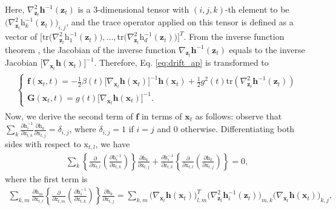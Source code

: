\documentclass{article}
\theoremstyle{definition}
\theoremstyle{remark}
\begin{document}
	Here, $\nabla_{\mathbf{z}_{t}}^{2}\mathbf{h}^{-1}(\mathbf{z}_{t})$ is a 3-dimensional tensor with $(i,j,k)$-th element to be $\big(\nabla_{\mathbf{z}_{t}}^{2}\mathrm{h}_{k}^{-1}(\mathbf{z}_{t})\big)_{i,j}$, and the trace operator applied on this tensor is defined as a vector of $\Big[\text{tr}\big(\nabla_{\mathbf{z}_{t}}^{2}\mathrm{h}_{1}^{-1}(\mathbf{z}_{t})\big),...,\text{tr}\big(\nabla_{\mathbf{z}_{t}}^{2}\mathrm{h}_{d}^{-1}(\mathbf{z}_{t})\big)\Big]^{T}$. From the inverse function theorem \citep{rudin1964principles}, the Jacobian of the inverse function $\nabla_{\mathbf{z}_{t}}\mathbf{h}^{-1}(\mathbf{z}_{t})$ equals to the inverse Jacobian $\big[\nabla_{\mathbf{x}_{t}}\mathbf{h}(\mathbf{x}_{t})\big]^{-1}$. Therefore, Eq. \eqref{eq:drift_ap} is transformed to
	\begin{align}\label{eq:drift_ap_ver2}
	\begin{split}
	\left\{\begin{array}{ll}
	\mathbf{f}(\mathbf{x}_{t},t)=-\frac{1}{2} \beta(t) \big[\nabla_{\mathbf{x}_{t}}\mathbf{h}(\mathbf{x}_{t})\big]^{-1} \mathbf{h}(\mathbf{x}_{t}) + \frac{1}{2} g^{2}(t) \text{tr} \left ( \nabla_{\mathbf{z}_{t}}^{2} \mathbf{h}^{-1}(\mathbf{z}_{t})    \right )\\[0.1cm]
	\mathbf{G}(\mathbf{x}_{t},t)=g(t) \big[\nabla_{\mathbf{x}_{t}}\mathbf{h}(\mathbf{x}_{t})\big]^{-1}.
	\end{array}\right.
	\end{split}
	\end{align}	
	Now, we derive the second term of $\mathbf{f}$ in terms of $\mathbf{x}_{t}$ as follows: observe that $\sum_{k}\frac{\partial \mathrm{h}_{i}^{-1}}{\partial\mathrm{z}_{t,k}}\frac{\partial\mathrm{h}_{k}}{\partial\mathrm{x}_{t,j}}=\delta_{i,j}$, where $\delta_{i,j}=1$ if $i=j$ and $0$ otherwise. Differentiating both sides with respect to $\mathrm{x}_{t,l}$, we have
	\begin{align*}
	\sum_{k} \left \{  \frac{\partial}{\partial \mathrm{x}_{t,l}} \left ( \frac{\partial \mathrm{h}^{-1}_{i}}{\partial \mathrm{z}_{t,k}} \right ) \right \} \frac{\partial \mathrm{h}_{k}}{\partial \mathrm{x}_{t,j}} + \frac{\partial \mathrm{h}^{-1}_{i}}{\partial \mathrm{z}_{t,k}} \left \{  \frac{\partial}{\partial \mathrm{x}_{t,l}} \left (\frac{\partial \mathrm{h}_{k}}{\partial \mathrm{x}_{t,j}} \right ) \right \}=0,
	\end{align*}
	where the first term is
	\begin{align*}
	\sum_{k,m} \frac{\partial \mathrm{h}_{m}}{\partial \mathrm{x}_{t,l}} \left \{  \frac{\partial}{\partial \mathrm{z}_{t,m}} \left ( \frac{\partial \mathrm{h}^{-1}_{i}}{\partial \mathrm{z}_{t,k}} \right ) \right \} \frac{\partial \mathrm{h}_{k}}{\partial \mathrm{x}_{t,j}} = \sum_{k,m} \big( \nabla_{\mathbf{x}_{t}} \mathbf{h}(\mathbf{x}_{t}) \big)^{T}_{l,m} \big( \nabla_{\mathbf{z}_{t}}^{2} \mathbf{h}_{i}^{-1}(\mathbf{z}_{t}) \big)_{m,k} \big(\nabla_{\mathbf{x}_{t}} \mathbf{h}(\mathbf{x}_{t})\big)_{k,j},
	\end{align*}
\end{document}
